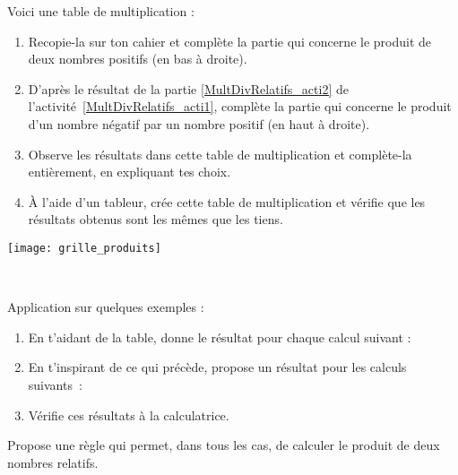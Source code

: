\begin{activite}

\begin{minipage}[c]{0.48\linewidth}
\begin{partie}
Voici une table de multiplication :
\begin{enumerate}
 \item Recopie-la sur ton cahier et complète la partie qui concerne le produit de deux nombres positifs (en bas à droite).
 \item D'après le résultat de la partie \ref{MultDivRelatifs_acti2} de l'activité \ref{MultDivRelatifs_acti1}, complète la partie qui concerne le produit d'un nombre négatif par un nombre positif (en haut à droite).
 \item Observe les résultats dans cette table de multiplication et complète-la entièrement, en expliquant tes choix.
 \item À l'aide d'un tableur, crée cette table de multiplication et vérifie que les résultats obtenus sont les mêmes que les tiens.
 \end{enumerate}
\end{partie}
\end{minipage} \hfill%
 \begin{minipage}[c]{0.48\linewidth}
  \texttt{[image: grille\_produits]}
  \end{minipage} \\

\begin{partie}
Application sur quelques exemples :
\begin{enumerate}
 \item En t'aidant de la table, donne le résultat pour chaque calcul suivant :
 \item En t'inspirant de ce qui précède, propose un résultat pour les calculs suivants :
 \item Vérifie ces résultats à la calculatrice.
 \end{enumerate}
\end{partie}

\begin{partie}
Propose une règle qui permet, dans tous les cas, de calculer le produit de deux nombres relatifs.
\end{partie}

\end{activite}

